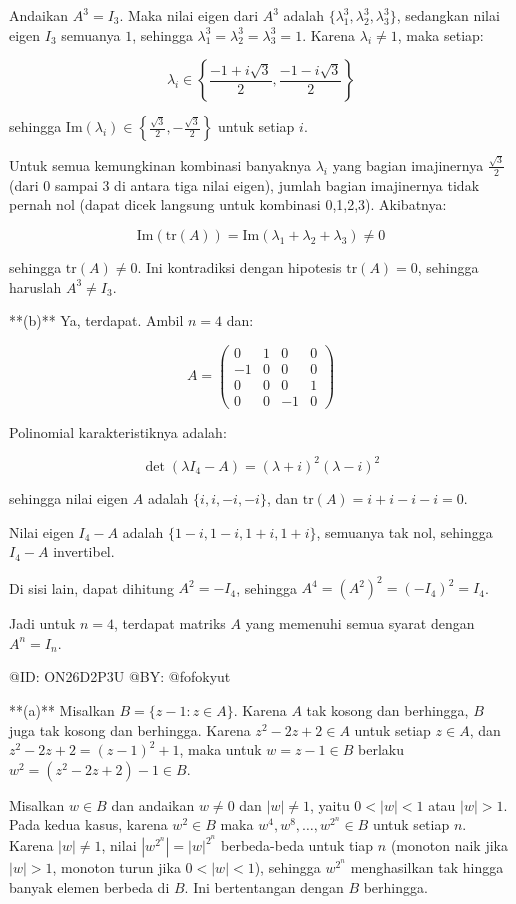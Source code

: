 Andaikan $A^3=I_3$. Maka nilai eigen dari $A^3$ adalah $\{\lambda_1^3,\lambda_2^3,\lambda_3^3\}$, sedangkan nilai eigen $I_3$ semuanya $1$, sehingga $\lambda_1^3=\lambda_2^3=\lambda_3^3=1$. Karena $\lambda_i \ne 1$, maka setiap:

$$
\lambda_i \in \left\{\frac{-1+i\sqrt3}{2}, \frac{-1-i\sqrt3}{2}\right\}
$$

sehingga $\mathrm{Im}(\lambda_i) \in \left\{\frac{\sqrt3}{2}, -\frac{\sqrt3}{2}\right\}$ untuk setiap $i$.

Untuk semua kemungkinan kombinasi banyaknya $\lambda_i$ yang bagian imajinernya $\frac{\sqrt3}{2}$ (dari 0 sampai 3 di antara tiga nilai eigen), jumlah bagian imajinernya tidak pernah nol (dapat dicek langsung untuk kombinasi 0,1,2,3). Akibatnya:

$$
\mathrm{Im}(\mathrm{tr}(A)) = \mathrm{Im}(\lambda_1+\lambda_2+\lambda_3) \ne 0
$$

sehingga $\mathrm{tr}(A) \ne 0$. Ini kontradiksi dengan hipotesis $\mathrm{tr}(A)=0$, sehingga haruslah $A^3 \ne I_3$.

**(b)** Ya, terdapat. Ambil $n=4$ dan:

$$
A = \begin{pmatrix} 0&1&0&0\\-1&0&0&0\\0&0&0&1\\0&0&-1&0\end{pmatrix}
$$

Polinomial karakteristiknya adalah:

$$
\det(\lambda I_4 - A) = (\lambda+i)^2(\lambda-i)^2
$$

sehingga nilai eigen $A$ adalah $\{i,i,-i,-i\}$, dan $\mathrm{tr}(A) = i+i-i-i = 0$.

Nilai eigen $I_4-A$ adalah $\{1-i,1-i,1+i,1+i\}$, semuanya tak nol, sehingga $I_4-A$ invertibel.

Di sisi lain, dapat dihitung $A^2 = -I_4$, sehingga $A^4 = (A^2)^2 = (-I_4)^2 = I_4$.

Jadi untuk $n=4$, terdapat matriks $A$ yang memenuhi semua syarat dengan $A^n=I_n$.

@ID: ON26D2P3U
@BY: @fofokyut

**(a)** Misalkan $B = \{z-1 : z \in A\}$. Karena $A$ tak kosong dan berhingga, $B$ juga tak kosong dan berhingga. Karena $z^2-2z+2 \in A$ untuk setiap $z\in A$, dan $z^2-2z+2 = (z-1)^2+1$, maka untuk $w=z-1\in B$ berlaku $w^2 = (z^2-2z+2)-1 \in B$.

Misalkan $w \in B$ dan andaikan $w \ne 0$ dan $|w|\ne 1$, yaitu $0<|w|<1$ atau $|w|>1$. Pada kedua kasus, karena $w^2 \in B$ maka $w^4, w^8, \dots, w^{2^n} \in B$ untuk setiap $n$. Karena $|w|\ne 1$, nilai $|w^{2^n}| = |w|^{2^n}$ berbeda-beda untuk tiap $n$ (monoton naik jika $|w|>1$, monoton turun jika $0<|w|<1$), sehingga $w^{2^n}$ menghasilkan tak hingga banyak elemen berbeda di $B$. Ini bertentangan dengan $B$ berhingga.

